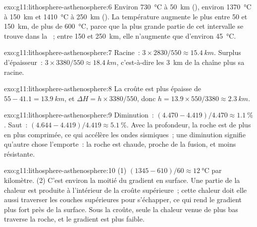 \begin{solution}{exo:g11:lithosphere-asthenosphere:6}
Environ \qty{730}{\celsius} à \qty{50}{km} (), environ
\qty{1370}{\celsius} à \qty{150}{km} et \qty{1410}{\celsius} à
\qty{250}{km} (). La température augmente le plus entre 50 et
\qty{150}{km}, de plus de \qty{600}{\celsius}, parce que la plus grande
partie de cet intervalle se trouve dans la ~; entre 150 et
\qty{250}{km}, elle n'augmente que d'environ \qty{45}{\celsius}.
\end{solution}

\begin{solution}{exo:g11:lithosphere-asthenosphere:7}
Racine~: $3 \times 2830/550 \approx \qty{15.4}{km}$. Surplus d'épaisseur~:
$3 \times 3380/550 \approx \qty{18.4}{km}$, c'est-à-dire les \qty{3}{km} de
la chaîne plus sa racine.
\end{solution}

\begin{solution}{exo:g11:lithosphere-asthenosphere:8}
La croûte est plus épaisse de $55 - 41.1 = \qty{13.9}{km}$, et $\Delta H = h
\times 3380/550$, donc $h = 13.9 \times 550/3380 \approx \qty{2.3}{km}$.
\end{solution}

\begin{solution}{exo:g11:lithosphere-asthenosphere:9}
Diminution~: $(4.470 - 4.419)/4.470 \approx \qty{1.1}{\percent}$. Saut~:
$(4.644 - 4.419)/4.419 \approx \qty{5.1}{\percent}$. Avec la profondeur, la
roche est de plus en plus comprimée, ce qui accélère les ondes sismiques~;
une diminution signifie qu'autre chose l'emporte~: la roche est chaude,
proche de la fusion, et moins résistante.
\end{solution}

\begin{solution}{exo:g11:lithosphere-asthenosphere:10}
(1) $(1345 - 610)/60 \approx \qty{12}{\celsius}$ par kilomètre. (2) C'est
environ la moitié du gradient en surface. Une partie de la chaleur est
produite à l'intérieur de la croûte supérieure~; cette chaleur doit elle
aussi traverser les couches supérieures pour s'échapper, ce qui rend le
gradient plus fort près de la surface. Sous la croûte, seule la chaleur
venue de plus bas traverse la roche, et le gradient est plus faible.
\end{solution}

